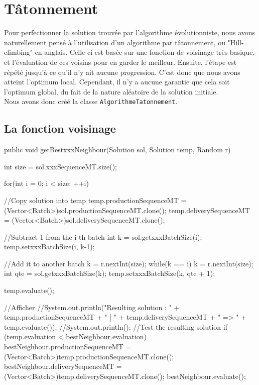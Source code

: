 \section{Tâtonnement}
Pour perfectionner la solution trouvée par l'algorithme évolutionniste, nous avons naturellement pensé à l'utilisation d'un algorithme par tâtonnement, ou "Hill-climbing" en anglais. Celle-ci est basée sur une fonction de voisinage très basique, et l'évaluation de ces voisins pour en garder le meilleur. Ensuite, l'étape est répété jusqu'à ce qu'il n'y ait aucune progression. C'est donc que nous avons atteint l'optimum local. Cependant, il n'y a aucune garantie que cela soit l'optimum global, du fait de la nature aléatoire de la solution initiale.\\
Nous avons donc créé la classe \verb!AlgorithmeTatonnement!.
\subsection{La fonction voisinage}

\begin{java}
public void getBestxxxNeighbour(Solution sol, Solution temp, Random r) {
	int size = sol.xxxSequenceMT.size();		
	
	for(int i = 0; i < size; ++i) {
		//Copy solution into temp
		temp.productionSequenceMT = (Vector<Batch>)sol.productionSequenceMT.clone();
		temp.deliverySequenceMT = (Vector<Batch>)sol.deliverySequenceMT.clone();
		
		//Subtract 1 from the i-th batch
		int k = sol.getxxxBatchSize(i);
		temp.setxxxBatchSize(i, k-1);
		
		//Add it to another batch
		k = r.nextInt(size);
		while(k == i)
			k = r.nextInt(size);
		int qte = sol.getxxxBatchSize(k);
		temp.setxxxBatchSize(k, qte + 1);
		
		temp.evaluate();
		
		//Afficher
		//System.out.println("Resulting solution : " + temp.productionSequenceMT + " | " + 			temp.deliverySequenceMT + " => " + temp.evaluate());
		//System.out.println();
		//Test the resulting solution
		if (temp.evaluation < bestNeighbour.evaluation) {
			bestNeighbour.productionSequenceMT = (Vector<Batch>)temp.productionSequenceMT.clone();
			bestNeighbour.deliverySequenceMT = (Vector<Batch>)temp.deliverySequenceMT.clone();
			bestNeighbour.evaluate();
		}
	}
}
\end{java}

\vspace{1em}

